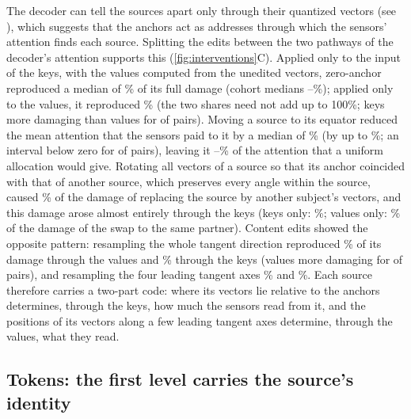 \documentclass[10pt,letterpaper]{article}
\begin{document}
The decoder can tell the sources apart only through their quantized vectors
(see ), which suggests that the anchors act as addresses through which the
sensors' attention finds each source. Splitting the edits between the two pathways of the
decoder's attention supports this (\cref{fig:interventions}C). Applied only to the input of the
keys, with the values computed from the unedited vectors, zero-anchor reproduced a median of
\KeysZeroMedianPct\% of its full damage (cohort medians \KeysZeroCohortMin--\KeysZeroCohortMax\%);
applied only to the values, it reproduced \ValuesZeroMedianPct\% (the two shares need not add up
to 100\%; keys more damaging than values for \KeysOverValuesZeroCount{} of \SourceCohortPairs{}
pairs). Moving a source to its equator reduced the mean attention that the sensors paid to it by
a median of \AttnDropMedianPct\% (by up to \AttnDropMax\%; an interval below zero for
\AttnDecreasedCount{} of \SourceCohortPairs{} pairs), leaving it \AttnUniformMin--\AttnUniformMax\%
of the attention that a uniform allocation would give. Rotating all vectors of a source so that its
anchor coincided with that of another source, which preserves every angle within the source,
caused \SwapOverSourceMedianPct\% of the damage of replacing the source by another subject's
vectors, and this damage arose almost entirely through the keys (keys only: \KeysSwapMedianPct\%;
values only: \ValuesSwapMedianPct\% of the damage of the swap to the same partner). Content edits showed the opposite
pattern: resampling the whole tangent direction reproduced \ValuesTangentMedianPct\% of its
damage through the values and \KeysTangentMedianPct\% through the keys (values more damaging
for \ValuesOverKeysTangentCount{} of \RoutingPairs{} pairs), and resampling the four leading
tangent axes \ValuesTPCfourMedianPct\% and \KeysTPCfourMedianPct\%. Each source therefore carries
a two-part code: where its vectors lie relative to the anchors determines, through the keys, how
much the sensors read from it, and the positions of its vectors along a few leading tangent axes
determine, through the values, what they read.

\subsection*{Tokens: the first level carries the source's identity}\label{sec:res-tokens}
\end{document}
